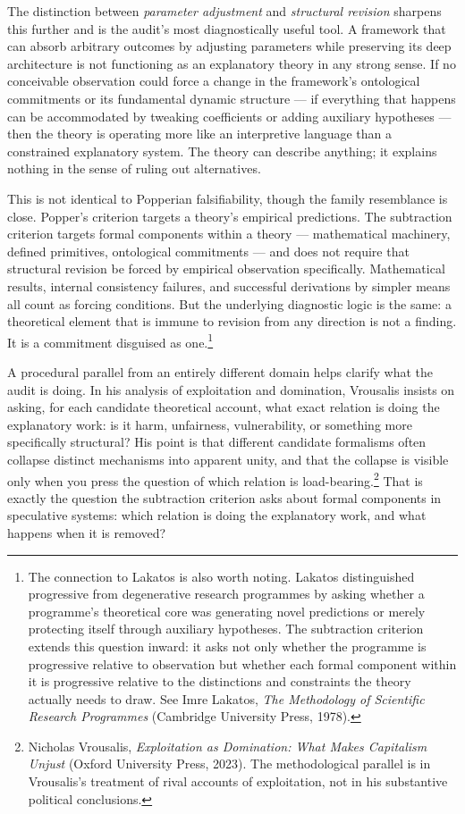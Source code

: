 \documentclass[12pt, a4paper]{article}
\begin{document}
The distinction between \textit{parameter adjustment} and \textit{structural revision} sharpens this further and is the audit's most diagnostically useful tool. A framework that can absorb arbitrary outcomes by adjusting parameters while preserving its deep architecture is not functioning as an explanatory theory in any strong sense. If no conceivable observation could force a change in the framework's ontological commitments or its fundamental dynamic structure --- if everything that happens can be accommodated by tweaking coefficients or adding auxiliary hypotheses --- then the theory is operating more like an interpretive language than a constrained explanatory system. The theory can describe anything; it explains nothing in the sense of ruling out alternatives.

This is not identical to Popperian falsifiability, though the family resemblance is close. Popper's criterion targets a theory's empirical predictions. The subtraction criterion targets formal components within a theory --- mathematical machinery, defined primitives, ontological commitments --- and does not require that structural revision be forced by empirical observation specifically. Mathematical results, internal consistency failures, and successful derivations by simpler means all count as forcing conditions. But the underlying diagnostic logic is the same: a theoretical element that is immune to revision from any direction is not a finding. It is a commitment disguised as one.\footnote{The connection to Lakatos is also worth noting. Lakatos distinguished progressive from degenerative research programmes by asking whether a programme's theoretical core was generating novel predictions or merely protecting itself through auxiliary hypotheses. The subtraction criterion extends this question inward: it asks not only whether the programme is progressive relative to observation but whether each formal component within it is progressive relative to the distinctions and constraints the theory actually needs to draw. See Imre Lakatos, \textit{The Methodology of Scientific Research Programmes} (Cambridge University Press, 1978).}

A procedural parallel from an entirely different domain helps clarify what the audit is doing. In his analysis of exploitation and domination, Vrousalis insists on asking, for each candidate theoretical account, what exact relation is doing the explanatory work: is it harm, unfairness, vulnerability, or something more specifically structural? His point is that different candidate formalisms often collapse distinct mechanisms into apparent unity, and that the collapse is visible only when you press the question of which relation is load-bearing.\footnote{Nicholas Vrousalis, \textit{Exploitation as Domination: What Makes Capitalism Unjust} (Oxford University Press, 2023). The methodological parallel is in Vrousalis's treatment of rival accounts of exploitation, not in his substantive political conclusions.} That is exactly the question the subtraction criterion asks about formal components in speculative systems: which relation is doing the explanatory work, and what happens when it is removed?
\end{document}
